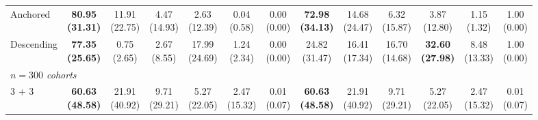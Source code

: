 {\begin{tabular}{l|cccccc|cccccc}
Anchored & \bfseries \makecell{80.95 \\ (31.31)} & \makecell{11.91 \\ (22.75)} & \makecell{4.47 \\ (14.93)} & {\cellcolor[HTML]{C8E6C9}} \makecell{2.63 \\ (12.39)} & \makecell{0.04 \\ (0.58)} & \makecell{0.00 \\ (0.00)} & \bfseries \makecell{72.98 \\ (34.13)} & \makecell{14.68 \\ (24.47)} & \makecell{6.32 \\ (15.87)} & {\cellcolor[HTML]{C8E6C9}} \makecell{3.87 \\ (12.80)} & \makecell{1.15 \\ (1.32)} & \makecell{1.00 \\ (0.00)} \\
Descending & \bfseries \makecell{77.35 \\ (25.65)} & \makecell{0.75 \\ (2.65)} & \makecell{2.67 \\ (8.55)} & {\cellcolor[HTML]{C8E6C9}} \makecell{17.99 \\ (24.69)} & \makecell{1.24 \\ (2.34)} & \makecell{0.00 \\ (0.00)} & \makecell{24.82 \\ (31.47)} & \makecell{16.41 \\ (17.34)} & \makecell{16.70 \\ (14.68)} & {\cellcolor[HTML]{C8E6C9}} \bfseries \makecell{32.60 \\ (27.98)} & \makecell{8.48 \\ (13.33)} & \makecell{1.00 \\ (0.00)} \\
\midrule
\multicolumn{13}{l}{\emph{$n = 300$ cohorts}} \\
3 + 3 & \bfseries \makecell{60.63 \\ (48.58)} & \makecell{21.91 \\ (40.92)} & \makecell{9.71 \\ (29.21)} & {\cellcolor[HTML]{C8E6C9}} \makecell{5.27 \\ (22.05)} & \makecell{2.47 \\ (15.32)} & \makecell{0.01 \\ (0.07)} & \bfseries \makecell{60.63 \\ (48.58)} & \makecell{21.91 \\ (40.92)} & \makecell{9.71 \\ (29.21)} & {\cellcolor[HTML]{C8E6C9}} \makecell{5.27 \\ (22.05)} & \makecell{2.47 \\ (15.32)} & \makecell{0.01 \\ (0.07)} \\

\end{tabular}}
